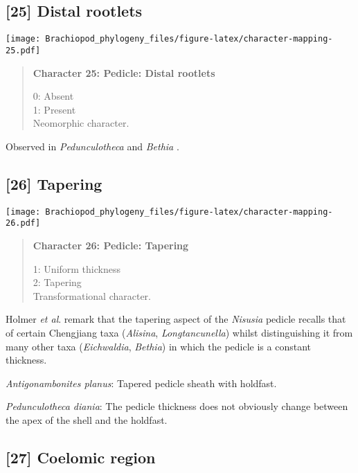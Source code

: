 \documentclass[openany]{book}
\theoremstyle{definition}
\theoremstyle{definition}
\theoremstyle{definition}
\theoremstyle{remark}
\begin{document}
\subsection*{{[}25{]} Distal rootlets}\label{distal-rootlets}

\texttt{[image: Brachiopod\_phylogeny\_files/figure-latex/character-mapping-25.pdf]}

\begin{quote}
\textbf{Character 25: Pedicle: Distal rootlets}

0: Absent\\
1: Present\\
Neomorphic character.
\end{quote}

Observed in \emph{Pedunculotheca} and \emph{Bethia}
\citep{Sutton2005Silurianbrachiopods}.

\subsection*{{[}26{]} Tapering}\label{tapering}

\texttt{[image: Brachiopod\_phylogeny\_files/figure-latex/character-mapping-26.pdf]}

\begin{quote}
\textbf{Character 26: Pedicle: Tapering}

1: Uniform thickness\\
2: Tapering\\
Transformational character.
\end{quote}

Holmer \emph{et al}. \citeyearpar{Holmer2018Theattachment} remark that
the tapering aspect of the \emph{Nisusia} pedicle recalls that of
certain Chengjiang taxa (\emph{Alisina}, \emph{Longtancunella}) whilst
distinguishing it from many other taxa (\emph{Eichwaldia},
\emph{Bethia}) in which the pedicle is a constant thickness.

\hypertarget{Antigonambonites_planus-coding-26}{}
\emph{Antigonambonites planus}: Tapered pedicle sheath with holdfast.

\hypertarget{Pedunculotheca_diania-coding-26}{}
\emph{Pedunculotheca diania}: The pedicle thickness does not obviously
change between the apex of the shell and the holdfast.

\subsection*{{[}27{]} Coelomic region}\label{coelomic-region}
\end{document}
